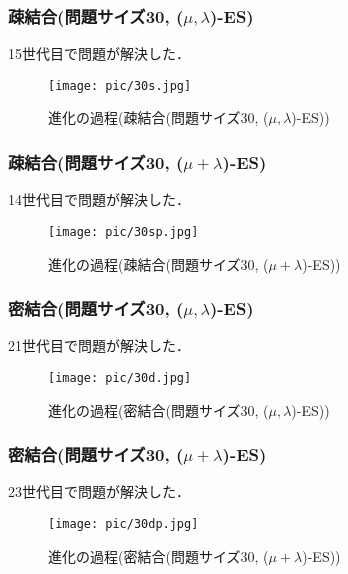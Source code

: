 \documentclass[a4j]{jarticle}
\begin{document}
\clearpage
\subsubsection*{疎結合(問題サイズ30, ($\mu , \lambda$)-ES)}
15世代目で問題が解決した．
\begin{figure}[htb]
 \begin{center}
  \texttt{[image: pic/30s.jpg]}
  \caption{進化の過程(疎結合(問題サイズ30, ($\mu , \lambda$)-ES))}
  \label{30s}
 \end{center}
\end{figure}

\subsubsection*{疎結合(問題サイズ30, ($\mu + \lambda$)-ES)}
14世代目で問題が解決した．
\begin{figure}[htb]
 \begin{center}
  \texttt{[image: pic/30sp.jpg]}
  \caption{進化の過程(疎結合(問題サイズ30, ($\mu + \lambda$)-ES))}
  \label{30sp}
 \end{center}
\end{figure}

\clearpage
\subsubsection*{密結合(問題サイズ30, ($\mu , \lambda$)-ES)}
21世代目で問題が解決した．
\begin{figure}[htb]
 \begin{center}
  \texttt{[image: pic/30d.jpg]}
  \caption{進化の過程(密結合(問題サイズ30, ($\mu , \lambda$)-ES))}
  \label{30d}
 \end{center}
\end{figure}

\subsubsection*{密結合(問題サイズ30, ($\mu + \lambda$)-ES)}
23世代目で問題が解決した．
\begin{figure}[htb]
 \begin{center}
  \texttt{[image: pic/30dp.jpg]}
  \caption{進化の過程(密結合(問題サイズ30, ($\mu + \lambda$)-ES))}
  \label{30dp}
 \end{center}
\end{figure}
\end{document}
